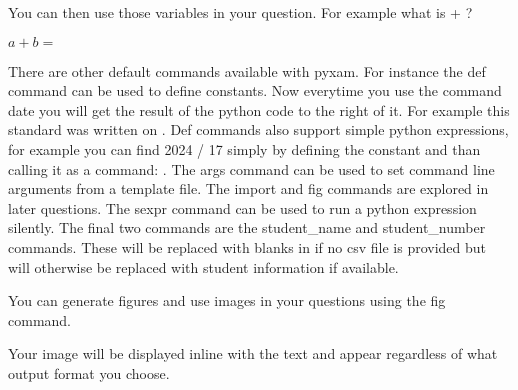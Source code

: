 \documentclass[12pt]{exam}
\begin{document}
\begin{questions}
\begin{comment}
import random

a = random.randint(0, 32)
b = random.randint(0, 32)

                \end{comment}
                You can then use those variables in your question. For example what is
                +
                ?
                \begin{solution}
                    $a + b =
                    $
                \end{solution}

                There are other default commands available with pyxam. For instance the def command can be used to define constants.
                Now everytime you use the command date you will get the result of the python code to the right of it. For example
                this standard was written on
                . Def commands also support simple python expressions, for example you can find 2024 / 17
                simply by defining the constant and than calling it as a command:
                . The args command can be used to set command line arguments from a template file. The import  and fig commands
                are explored in later questions. The sexpr command can be used to run a python expression silently. The
                final two commands are the student\_name and student\_number commands. These will be replaced with blanks in
                if no csv file is provided but will otherwise be replaced with student information if available.

                You can generate figures and use images in your questions using the fig command.
                \begin{comment} pyxam!fig

import matplotlib.pyplot as plt
plt.plot([1,2,3,4])
plt.ylabel('Y axis')
plt.xlabel('X axis')
plt.title('A Simple Graph')
plt.show()

                \end{comment}
                Your image will be displayed inline with the text and appear regardless of what output format you choose.


        \end{questions}



    
\end{document}
